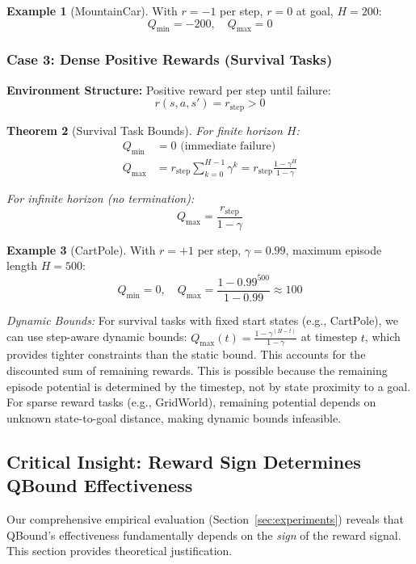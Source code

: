 \documentclass[11pt]{article}
\newtheorem{theorem}{Theorem}
\theoremstyle{definition}
\newtheorem{example}[theorem]{Example}
\theoremstyle{remark}
\begin{document}
\begin{example}[MountainCar]
With $r = -1$ per step, $r = 0$ at goal, $H = 200$:
$$Q_{\min} = -200, \quad Q_{\max} = 0$$
\end{example}

\subsubsection{Case 3: Dense Positive Rewards (Survival Tasks)}

\textbf{Environment Structure:} Positive reward per step until failure:
$$r(s,a,s') = r_{\text{step}} > 0$$

\begin{theorem}[Survival Task Bounds]
For finite horizon $H$:
\begin{align}
Q_{\min} &= 0 \text{ (immediate failure)} \\
Q_{\max} &= r_{\text{step}} \sum_{k=0}^{H-1} \gamma^k = r_{\text{step}} \frac{1-\gamma^H}{1-\gamma}
\end{align}

For infinite horizon (no termination):
$$Q_{\max} = \frac{r_{\text{step}}}{1-\gamma}$$
\end{theorem}

\begin{example}[CartPole]
With $r = +1$ per step, $\gamma = 0.99$, maximum episode length $H = 500$:
$$Q_{\min} = 0, \quad Q_{\max} = \frac{1-0.99^{500}}{1-0.99} \approx 100$$

\textit{Dynamic Bounds:} For survival tasks with fixed start states (e.g., CartPole), we can use step-aware dynamic bounds: $Q_{\max}(t) = \frac{1-\gamma^{(H-t)}}{1-\gamma}$ at timestep $t$, which provides tighter constraints than the static bound. This accounts for the discounted sum of remaining rewards. This is possible because the remaining episode potential is determined by the timestep, not by state proximity to a goal. For sparse reward tasks (e.g., GridWorld), remaining potential depends on unknown state-to-goal distance, making dynamic bounds infeasible.
\end{example}

\subsection{Critical Insight: Reward Sign Determines QBound Effectiveness}
\label{subsec:reward-sign-dependence}

Our comprehensive empirical evaluation (Section~\ref{sec:experiments}) reveals that QBound's effectiveness fundamentally depends on the \textit{sign} of the reward signal. This section provides theoretical justification.
\end{document}
